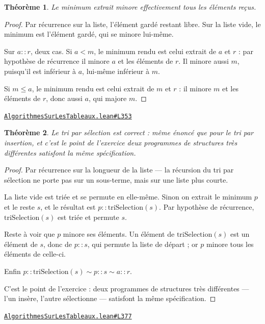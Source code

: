 \documentclass[11pt,a4paper]{article}
\theoremstyle{definition}
\theoremstyle{plain}
\newtheorem{theoreme}{Théorème}
\newcommand{\source}[2]{\par\smallskip\noindent\hfill{\footnotesize\href{#1}{\texttt{#2}}}\par\smallskip}
\begin{document}
\begin{theoreme}
Le minimum extrait minore effectivement tous les éléments reçus.
\end{theoreme}
\begin{proof}
Par récurrence sur la liste, l'élément gardé restant libre. Sur la liste vide, le
minimum est l'élément gardé, qui se minore lui-même.

Sur \(a :: r\), deux cas. Si \(a < m\), le minimum rendu est celui extrait de \(a\) et
\(r\) : par hypothèse de récurrence il minore \(a\) et les éléments de \(r\). Il minore
aussi \(m\), puisqu'il est inférieur à \(a\), lui-même inférieur à \(m\).

Si \(m \le a\), le minimum rendu est celui extrait de \(m\) et \(r\) : il minore \(m\)
et les éléments de \(r\), donc aussi \(a\), qui majore \(m\).
\end{proof}
\source{https://github.com/Commutator-IO/learn-lean/blob/main/courses/02-lycee/11-informatique-nsi/AlgorithmesSurLesTableaux.lean\#L353}{AlgorithmesSurLesTableaux.lean\#L353}

\begin{theoreme}
Le tri par sélection est correct : même énoncé que pour le tri par insertion, et
c'est le point de l'exercice \textemdash{} deux programmes de structures très différentes
satisfont la même spécification.
\end{theoreme}
\begin{proof}
Par récurrence sur la longueur de la liste — la récursion du tri par sélection ne porte
pas sur un sous-terme, mais sur une liste plus courte.

La liste vide est triée et se permute en elle-même. Sinon on extrait le minimum \(p\) et
le reste \(s\), et le résultat est \(p :: \mathrm{triSelection}(s)\). Par hypothèse de
récurrence, \(\mathrm{triSelection}(s)\) est triée et permute \(s\).

Reste à voir que \(p\) minore ses éléments. Un élément de \(\mathrm{triSelection}(s)\)
est un élément de \(s\), donc de \(p :: s\), qui permute la liste de départ ; or \(p\)
minore tous les éléments de celle-ci.

Enfin \(p :: \mathrm{triSelection}(s) \sim p :: s \sim a :: r\).

C'est le point de l'exercice : deux programmes de structures très différentes — l'un
insère, l'autre sélectionne — satisfont la même spécification.
\end{proof}
\source{https://github.com/Commutator-IO/learn-lean/blob/main/courses/02-lycee/11-informatique-nsi/AlgorithmesSurLesTableaux.lean\#L377}{AlgorithmesSurLesTableaux.lean\#L377}
\end{document}
